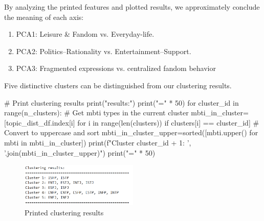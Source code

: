 \documentclass[12pt]{article}
\begin{document}
	By analyzing the printed features and plotted results, we approximately conclude the meaning of each axis:
	\begin{enumerate}
	\item PCA1: Leisure \& Fandom vs. Everyday-life.
	\item PCA2: Politics–Rationality vs. Entertainment–Support.
	\item PCA3: Fragmented expressions vs. centralized fandom behavior
	\end{enumerate}
	
	Five distinctive clusters can be distinguished from our clustering results.
	\begin{python}
    # Print clustering results
    print("\nClustering results:")
    print("=" * 50)
    for cluster_id in range(n_clusters):
        # Get mbti types in the current cluster
        mbti_in_cluster=[topic_dist_df.index[i] for i in range(len(clusters)) if clusters[i] == cluster_id]
        # Convert to uppercase and sort
        mbti_in_cluster_upper=sorted([mbti.upper() for mbti in mbti_in_cluster])
        print(f"Cluster {cluster_id + 1}: {', '.join(mbti_in_cluster_upper)}")
    print("=" * 50)
	\end{python}

	\begin{figure}[H]
			\centering
			\includegraphics[width=0.5\textwidth]{Q2cluster1} 
			\caption{\centering Printed clustering results}		
	\end{figure}
	
\end{document}
